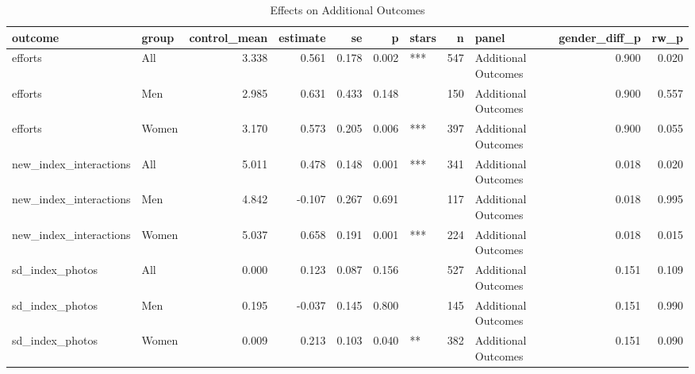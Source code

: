 \begin{table}

\caption{Effects on Additional Outcomes}
\centering
\begin{tabular}[t]{llrrrrlrlrr}
\toprule
outcome & group & control\_mean & estimate & se & p & stars & n & panel & gender\_diff\_p & rw\_p\\
\midrule
efforts & All & 3.338 & 0.561 & 0.178 & 0.002 & *** & 547 & Additional Outcomes & 0.900 & 0.020\\
efforts & Men & 2.985 & 0.631 & 0.433 & 0.148 &  & 150 & Additional Outcomes & 0.900 & 0.557\\
efforts & Women & 3.170 & 0.573 & 0.205 & 0.006 & *** & 397 & Additional Outcomes & 0.900 & 0.055\\
new\_index\_interactions & All & 5.011 & 0.478 & 0.148 & 0.001 & *** & 341 & Additional Outcomes & 0.018 & 0.020\\
new\_index\_interactions & Men & 4.842 & -0.107 & 0.267 & 0.691 &  & 117 & Additional Outcomes & 0.018 & 0.995\\
\addlinespace
new\_index\_interactions & Women & 5.037 & 0.658 & 0.191 & 0.001 & *** & 224 & Additional Outcomes & 0.018 & 0.015\\
sd\_index\_photos & All & 0.000 & 0.123 & 0.087 & 0.156 &  & 527 & Additional Outcomes & 0.151 & 0.109\\
sd\_index\_photos & Men & 0.195 & -0.037 & 0.145 & 0.800 &  & 145 & Additional Outcomes & 0.151 & 0.990\\
sd\_index\_photos & Women & 0.009 & 0.213 & 0.103 & 0.040 & ** & 382 & Additional Outcomes & 0.151 & 0.090\\
\bottomrule
\end{tabular}
\end{table}
